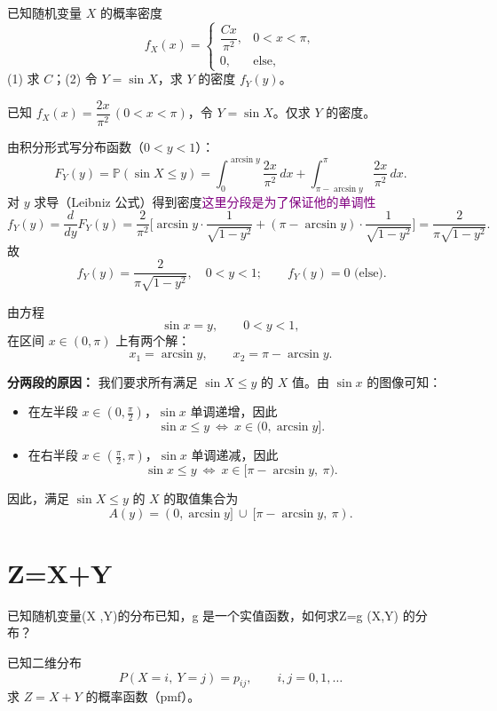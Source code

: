 \begin{example}


已知随机变量 $X$ 的概率密度
\[
f_X(x)=
\begin{cases}
\dfrac{C x}{\pi^2}, & 0<x<\pi,\\[4pt]
0,&\text{else,}
\end{cases}
\]
(1) 求 $C$；(2) 令 $Y=\sin X$，求 $Y$ 的密度 $f_Y(y)$。
\end{example}
\begin{solution}
已知 $f_X(x)=\dfrac{2x}{\pi^2}\,(0<x<\pi)$，令 $Y=\sin X$。仅求 $Y$ 的密度。

由积分形式写分布函数（$0<y<1$）：
\[
F_Y(y)=\mathbb P(\sin X\le y)
=\int_{0}^{\arcsin y}\frac{2x}{\pi^2}\,dx
+\int_{\pi-\arcsin y}^{\pi}\frac{2x}{\pi^2}\,dx .
\]
对 $y$ 求导（Leibniz 公式）得到密度\textcolor{purple}{这里分段是为了保证他的单调性}
\[
f_Y(y)=\frac{d}{dy}F_Y(y)
=\frac{2}{\pi^2}\Big[
\arcsin y\cdot\frac{1}{\sqrt{1-y^2}}
+(\pi-\arcsin y)\cdot\frac{1}{\sqrt{1-y^2}}
\Big]
=\frac{2}{\pi\sqrt{1-y^2}}.
\]
故
\[
\boxed{\,f_Y(y)=\dfrac{2}{\pi\sqrt{1-y^2}},\quad 0<y<1;\qquad f_Y(y)=0\text{ (else)}.}
\]
\end{solution}
由方程
\[
\sin x = y, \qquad 0<y<1,
\]
在区间 $x\in(0,\pi)$ 上有两个解：
\[
x_1 = \arcsin y, \qquad x_2 = \pi - \arcsin y.
\]

\medskip
\noindent\textbf{分两段的原因：}  
我们要求所有满足 $\sin X \le y$ 的 $X$ 值。由 $\sin x$ 的图像可知：

\begin{itemize}
  \item 在左半段 $x\in(0,\tfrac{\pi}{2})$，$\sin x$ 单调递增，因此
  \[
  \sin x \le y \ \Longleftrightarrow\ x \in (0,\arcsin y].
  \]
  \item 在右半段 $x\in(\tfrac{\pi}{2},\pi)$，$\sin x$ 单调递减，因此
  \[
  \sin x \le y \ \Longleftrightarrow\ x \in [\pi-\arcsin y,\ \pi).
  \]
\end{itemize}

\noindent 因此，满足 $\sin X \le y$ 的 $X$ 的取值集合为
\[
A(y) = (0,\arcsin y]\ \cup\ [\pi-\arcsin y,\ \pi).
\]
\section{Z=X+Y}
已知随机变量(X ,Y)的分布已知，g
是一个实值函数，如何求Z=g (X,Y) 的分
布？
\begin{example}
已知二维分布
\[
P(X=i,\ Y=j)=p_{ij},\qquad i,j=0,1,\dots
\]
求 $Z=X+Y$ 的概率函数（pmf）。
\end{example}

